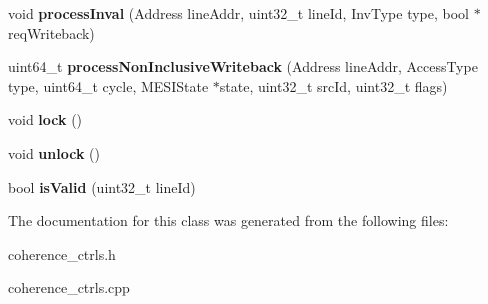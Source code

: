 \begin{DoxyCompactItemize}
\item 
\hypertarget{classMESIBottomCC_abf24d8aff75aeef0d89e90e6006adbe7}{void {\bfseries process\-Inval} (Address line\-Addr, uint32\-\_\-t line\-Id, Inv\-Type type, bool $\ast$req\-Writeback)}\label{classMESIBottomCC_abf24d8aff75aeef0d89e90e6006adbe7}

\item 
\hypertarget{classMESIBottomCC_ac2b2916af63b5fb75e24b5659c54e1fd}{uint64\-\_\-t {\bfseries process\-Non\-Inclusive\-Writeback} (Address line\-Addr, Access\-Type type, uint64\-\_\-t cycle, M\-E\-S\-I\-State $\ast$state, uint32\-\_\-t src\-Id, uint32\-\_\-t flags)}\label{classMESIBottomCC_ac2b2916af63b5fb75e24b5659c54e1fd}

\item 
\hypertarget{classMESIBottomCC_a08911f3e7f3f4d1b84532a06186cdb57}{void {\bfseries lock} ()}\label{classMESIBottomCC_a08911f3e7f3f4d1b84532a06186cdb57}

\item 
\hypertarget{classMESIBottomCC_aed3169349f616a6f662c1698e0ef4956}{void {\bfseries unlock} ()}\label{classMESIBottomCC_aed3169349f616a6f662c1698e0ef4956}

\item 
\hypertarget{classMESIBottomCC_aa88f5fe706c2754c4a52b5ded557209e}{bool {\bfseries is\-Valid} (uint32\-\_\-t line\-Id)}\label{classMESIBottomCC_aa88f5fe706c2754c4a52b5ded557209e}

\end{DoxyCompactItemize}


The documentation for this class was generated from the following files\-:\begin{DoxyCompactItemize}
\item 
coherence\-\_\-ctrls.\-h\item 
coherence\-\_\-ctrls.\-cpp\end{DoxyCompactItemize}
